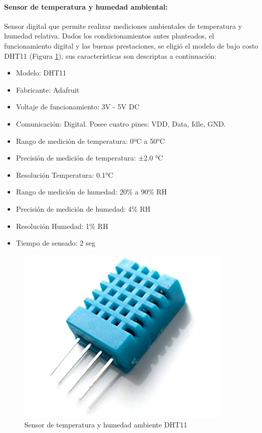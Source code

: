             \paragraph{Sensor de temperatura y humedad ambiental:}Sensor digital que permite realizar mediciones ambientales de temperatura y humedad relativa. Dados los condicionamientos antes planteados, el funcionamiento digital y las buenas prestaciones, se eligió el modelo de bajo costo DHT11 (Figura \ref{SensorDHT11}), sus características son descriptas a continuación:
                \begin{itemize}
                    \item Modelo: DHT11
                    \item Fabricante: Adafruit
                    \item Voltaje de funcionamiento: 3V - 5V DC
                    \item Comunicación: Digital. Posee cuatro pines: VDD, Data, Idle, GND.
                    \item Rango de medición de temperatura: 0ºC a 50°C
                    \item Precisión de medición de temperatura: ±2.0 °C
                    \item Resolución Temperatura: 0.1°C
                    \item Rango de medición de humedad: 20\% a 90\% RH
                    \item Precisión de medición de humedad: 4\% RH
                    \item Resolución Humedad: 1\% RH
                    \item Tiempo de sensado: 2 seg
                \end{itemize}
                
                \begin{figure} [h]
                    \centering
                    \includegraphics[scale=0.35]{hardware/dht11_.jpg}
                    \caption{Sensor de temperatura y humedad ambiente DHT11}
                    \label{SensorDHT11}
                \end{figure}

